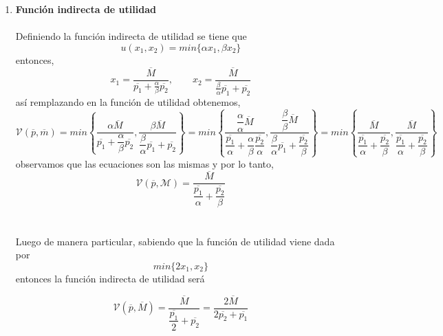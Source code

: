 \begin{enumerate}
\begin{enumerate}[\bfseries a)]
	    \item \textbf{Función indirecta de utilidad}\\\\
		Definiendo la función indirecta de utilidad se tiene que 
		$$u(x_1,x_2) = min\lbrace \alpha x_1,\beta x_2\rbrace$$
		entonces,
		$$x_1=\dfrac{\overline{M}}{\overline{p_1}+\frac{\alpha}{\beta}\overline{p_2}}, \qquad x_2=\dfrac{\overline{M}}{\frac{\beta}{\alpha}\overline{p_1}+\overline{p_2}}$$
		así remplazando en la función de utilidad obtenemos,
		$$\mathcal{V}(\overline{p},\overline{m}) = min \left\{ \dfrac{\alpha \overline{M}}{\overline{p_1} + \dfrac{\alpha}{\beta}\overline{p_2}},\dfrac{\beta \overline{M}}{\dfrac{\beta}{\alpha}\overline{p_1}+\overline{p_2}} \right\} = min \left\{ \dfrac{\dfrac{\alpha}{\alpha} \overline{M}}{\dfrac{\overline{p_1}}{\alpha} + \dfrac{\alpha}{\beta}\dfrac{\overline{p_2}}{\alpha}},\dfrac{\dfrac{\beta}{\beta} \overline{M}}{\dfrac{\beta}{\alpha}\overline{p_1}+\dfrac{\overline{p_2}}{\beta}} \right\} = min \left\{ \dfrac{\overline{M}}{\dfrac{\overline{p_1}}{\alpha} + \dfrac{\overline{p_2}}{\beta}},\dfrac{\overline{M}}{\dfrac{\overline{p_1}}{\alpha}+\dfrac{\overline{p_2}}{\beta}} \right\}$$
		observamos que las ecuaciones son las mismas y por lo tanto,\\
		$$\mathcal{V}(\overline{p},\mathcal{M}) = \dfrac{\overline{M}}{\dfrac{\overline{p_1}}{\alpha}+\dfrac{\overline{p_2}}{\beta}}$$\\\\
		Luego de manera particular, sabiendo que la función de utilidad viene dada por 
		$$min\lbrace 2x_1,x_2\rbrace$$
		entonces la función indirecta de utilidad será 

		\begin{tcolorbox}[colframe=white]
		    $$\mathcal{V}(\overline{p},\overline{M}) = \dfrac{\overline{M}}{\dfrac{\overline{p_1}}{2}+\overline{p_2}} = \dfrac{2\overline{M}}{2\overline{p_2}+\overline{p_1}}$$
	    \end{tcolorbox}



	\end{enumerate}


\end{enumerate}
